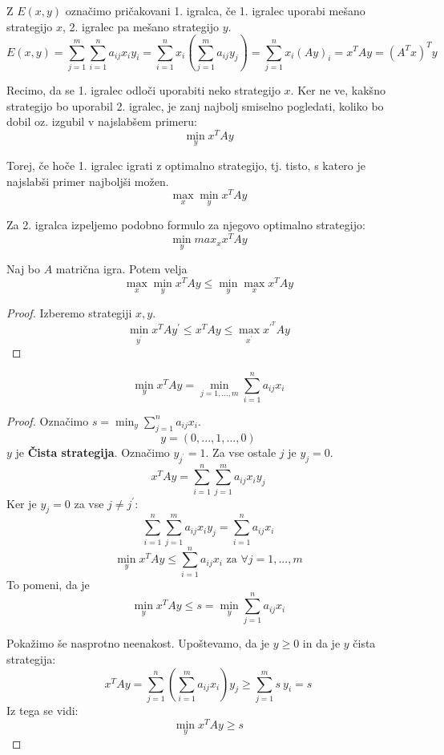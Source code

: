 \documentclass[11pt, a4paper]{article}
\begin{document}
    Z \(E(x,y)\) označimo pričakovani 1. igralca, če 1. igralec uporabi mešano strategijo \(x\), 2. igralec pa mešano strategijo \(y\).
    \[
        E(x,y) = \sum_{j=1}^{m} \sum_{i=1}^{n} a_{ij} x_i y_i = \sum_{i=1}^{n} x_i (\sum_{j=1}^m a_{ij} y_j) = \sum_{j=1}^n x_i (Ay)_i = x^T A y = (A^T x)^T y    
    \]

    Recimo, da se 1. igralec odloči uporabiti neko strategijo \(x\). Ker ne ve, kakšno strategijo bo uporabil 2. igralec, je zanj najbolj smiselno pogledati, koliko bo dobil oz. izgubil v najslabšem primeru:
    \[
        \min_y x^T A y    
    \]

    Torej, če hoče 1. igralec igrati z optimalno strategijo, tj. tisto, s katero je najslabši primer najboljši možen.
    \[
        \max_x \min_y x^T A y    
    \]

    Za 2. igralca izpeljemo podobno formulo za njegovo optimalno strategijo:
    \[
        \min_y max_x x^T A y    
    \]
    
    \begin{proposition}
        Naj bo \(A\) matrična igra. Potem velja
        \[
            \max_x \min_y x^T A y \le \min_y \max_x x^T A y    
        \]
    \end{proposition}

    \begin{proof}
        Izberemo strategiji \(x,y\).
        \[
            \min_{y^\prime} x^T A y^\prime \le x^T A y \le \max_{x^\prime} x^{\prime^T} A y    
        \]
    \end{proof}

    \begin{lemma}
        \[
            \min_y x^T A y = \min_{j=1,...,m} \sum_{i=1}^n a_{ij} x_i    
        \]
    \end{lemma}

    \begin{proof}
        Označimo \(s = \min_y \sum_{j=1}^n a_{ij} x_i\).
        \[
            y = (0,...,1,...,0)    
        \]
        \(y\) je \textbf{Čista strategija}. Označimo \(y_{j^\prime} = 1\). Za vse ostale \(j\) je \(y_j = 0\). 
        \[
            x^T A y = \sum_{i=1}^n \sum_{j=1}^m a_{ij} x_i y_j 
        \]
        Ker je \(y_j=0\) za vse \(j \neq j^\prime\):
        \[
            \sum_{i=1}^n \sum_{j=1}^m a_{ij} x_i y_j  = \sum_{i=1}^n a_{ij} x_i    
        \]
        \[
            \min_y x^T A y \le \sum_{i=1}^n a_{ij} x_i \text{ za } \forall j=1,...,m    
        \]
        To pomeni, da je 
        \[
            \min_y x^T A y \le s = \min_y \sum_{j=1}^n a_{ij} x_i 
        \]


        Pokažimo še nasprotno neenakost. Upoštevamo, da je \(y \ge 0\) in da je \(y\) čista strategija:
        \[
            x^T A y = \sum_{j=1}^n (\sum_{i=1}^m a_{ij} x_i) y_j \ge \sum_{j=1}^m s\ y_i = s
        \]
        Iz tega se vidi:
        \[
            \min_y x^T A y \ge s
        \]
    \end{proof}
\end{document}
